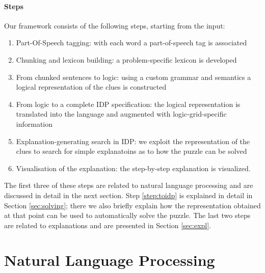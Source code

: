 \paragraph{Steps}
Our framework consists of the following steps, starting from the input:
\begin{enumerate}[A]
\item Part-Of-Speech tagging: with each word a part-of-speech tag is associated
\item Chunking and lexicon building: a problem-specific lexicon is developed
\item From chunked sentences to logic: using a custom grammar and semantics a logical representation of the clues is constructed
 \item From logic to a complete IDP specification: the logical representation is translated into the \idp language and augmented with logic-grid-specific information \label{step:toidp}
\item Explanation-generating search in IDP: we exploit the \idp representation of the clues to search for simple explanatoins as to how the puzzle can be solved
\item Visualisation of the explanation: the step-by-step explanation is visualized.
\end{enumerate}
% 
% 

The first three of these steps are related to natural language processing and are discussed in detail in the next section. Step \ref{step:toidp} is explained in detail in Section \ref{sec:solving}; there we also briefly explain how the representation obtained at that point can be used to automatically solve the puzzle. 
The last two steps are related to explanations and are presented in Section \ref{sec:expl}. 

\section{Natural Language Processing}\label{sec:nlp}

